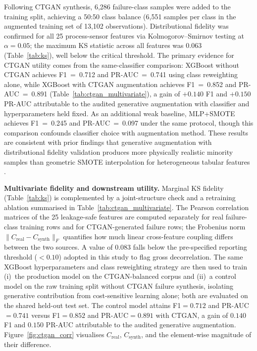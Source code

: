 \documentclass[sensors,article,submit,pdftex,moreauthors]{Definitions/mdpi}
\begin{document}
Following CTGAN synthesis, 6{,}286 failure-class samples were added
to the training split, achieving a 50:50 class balance
(6{,}551 samples per class in the augmented training set of
13{,}102 observations).
Distributional fidelity was confirmed for all 25 process-sensor
features via Kolmogorov--Smirnov testing at $\alpha = 0.05$; the
maximum KS statistic across all features was 0.063
(Table~\ref{tab:ks}), well below the critical threshold.
The primary evidence for CTGAN utility comes from the same-classifier
comparison: XGBoost without CTGAN achieves F1~=~0.712 and PR-AUC~=~0.741
using class reweighting alone, while XGBoost with CTGAN augmentation
achieves F1~=~0.852 and PR-AUC~=~0.891
(Table~\ref{tab:ctgan_multivariate}), a gain of $+0.140$ F1 and
$+0.150$ PR-AUC attributable to the audited generative augmentation with
classifier and hyperparameters held fixed.  As an additional weak baseline,
MLP+SMOTE achieves F1~=~0.245 and PR-AUC~=~0.097 under the same protocol,
though this comparison confounds classifier choice with augmentation method.
These results are consistent with prior findings that generative
augmentation with distributional fidelity validation produces more
physically realistic minority samples than geometric SMOTE
interpolation for heterogeneous tabular features
\citep{ref-ctgan-steel2025}.

\textbf{Multivariate fidelity and downstream utility.}
Marginal KS fidelity (Table~\ref{tab:ks}) is complemented by a
joint-structure check and a retraining ablation summarised in
Table~\ref{tab:ctgan_multivariate}.
The Pearson correlation matrices of the 25 leakage-safe features are
computed separately for real failure-class training rows and for
CTGAN-generated failure rows; the Frobenius norm
$\|C_{\mathrm{real}} - C_{\mathrm{synth}}\|_F$ quantifies how much
linear cross-feature coupling differs between the two sources.
A value of $0.083$ falls below the pre-specified reporting threshold
($<0.10$) adopted in this study to flag gross decorrelation.
The same XGBoost hyperparameters and class reweighting strategy are
then used to train (i)~the production model on the CTGAN-balanced
corpus and (ii)~a control model on the raw training split without CTGAN
failure synthesis, isolating generative contribution from cost-sensitive
learning alone; both are evaluated on the shared held-out test set.
The control model attains F1${}=0.712$ and PR-AUC${}=0.741$ versus
F1${}=0.852$ and PR-AUC${}=0.891$ with CTGAN, a gain of $0.140$ F1 and
$0.150$ PR-AUC attributable to the audited generative augmentation.
Figure~\ref{fig:ctgan_corr} visualises $C_{\mathrm{real}}$,
$C_{\mathrm{synth}}$, and the element-wise magnitude of their
difference.
\end{document}
